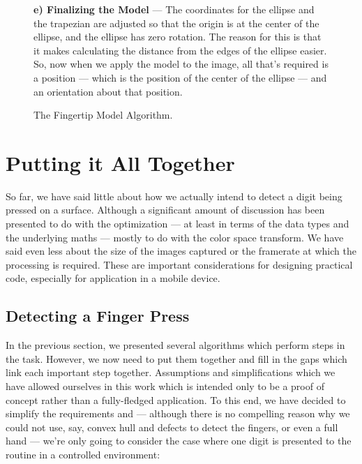 \begin{figure}
    \begin{minipage}{0.95\textwidth}
         \textbf{e) Finalizing the Model} --- The coordinates for the ellipse and the trapezian are adjusted so that the origin is at the center of the ellipse, and the ellipse has zero rotation. The reason for this is that it makes calculating the distance from the edges of the ellipse easier. So, now when we apply the model to the image, all that's required is a position --- which is the position of the center of the ellipse --- and an orientation about that position. 
    \end{minipage}
    \caption{The Fingertip Model Algorithm.}\label{fig:ModelingFingertip}
\end{figure}


\section{Putting it All Together}\label{sec:PuttingItAllTogether}

So far, we have said little about how we actually intend to detect a digit being pressed on a surface. Although a significant amount of discussion has been presented to do with the optimization --- at least in terms of the data types and the underlying maths --- mostly to do with the color space transform. We have said even less about the size of the images captured or the framerate at which the processing is required. These are important considerations for designing practical code, especially for application in a mobile device.

\subsection{Detecting a Finger Press}\label{sec:DetectingAFingerPress}

In the previous section, we presented several algorithms which perform steps in the task. However, we now need to put them together and fill in the gaps which link each important step together. Assumptions and simplifications which we have allowed ourselves in this work which is intended only to be a proof of concept rather than a fully-fledged application. To this end, we have decided to simplify the requirements and --- although there is no compelling reason why we could not use, say, convex hull and defects to detect the fingers, or even a full hand --- we're only going to consider the case where one digit is presented to the routine in a controlled environment:

